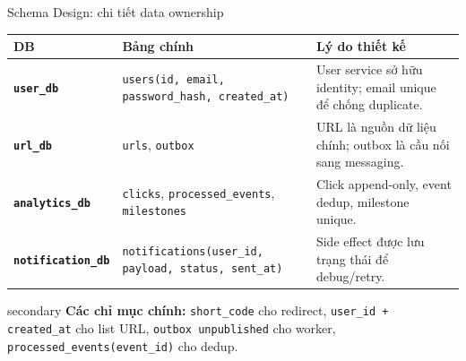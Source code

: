 \documentclass[aspectratio=169]{beamer}
\begin{document}
\begin{frame}{Schema Design: chi tiết data ownership}
    \scriptsize
    \begin{center}
    \begin{tabular}{>{\bfseries}p{}p{}p{}}
        \toprule
        DB & Bảng chính & Lý do thiết kế \\
        \midrule
        \texttt{user\_db} & \texttt{users(id, email, password\_hash, created\_at)} & User service sở hữu identity; email unique để chống duplicate. \\
        \texttt{url\_db} & \texttt{urls}, \texttt{outbox} & URL là nguồn dữ liệu chính; outbox là cầu nối sang messaging. \\
        \texttt{analytics\_db} & \texttt{clicks}, \texttt{processed\_events}, \texttt{milestones} & Click append-only, event dedup, milestone unique. \\
        \texttt{notification\_db} & \texttt{notifications(user\_id, payload, status, sent\_at)} & Side effect được lưu trạng thái để debug/retry. \\
        \bottomrule
    \end{tabular}
    \end{center}
    \vspace{0.3cm}
    \begin{claimbox}{secondary}
        \small \textbf{Các chỉ mục chính:} \texttt{short\_code} cho redirect, \texttt{user\_id + created\_at} cho list URL, \texttt{outbox unpublished} cho worker, \texttt{processed\_events(event\_id)} cho dedup.
    \end{claimbox}
\end{frame}
\end{document}
